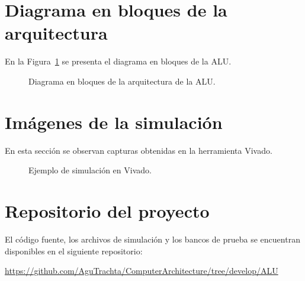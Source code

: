 \section{Diagrama en bloques de la arquitectura}
En la Figura~\ref{fig:diagrama} se presenta el diagrama en bloques de la ALU.

\begin{figure}[H]
    \centering
    \caption{Diagrama en bloques de la arquitectura de la ALU.}
    \label{fig:diagrama}
\end{figure}

\section{Imágenes de la simulación}
En esta sección se observan capturas obtenidas en la herramienta Vivado.

\begin{figure}[H]
    \centering
    \caption{Ejemplo de simulación en Vivado.}
\end{figure}

\section{Repositorio del proyecto}
El código fuente, los archivos de simulación y los bancos de prueba se encuentran disponibles en el siguiente repositorio:  

\href{https://github.com/AguTrachta/ComputerArchitecture/tree/develop/ALU}{https://github.com/AguTrachta/ComputerArchitecture/tree/develop/ALU}
